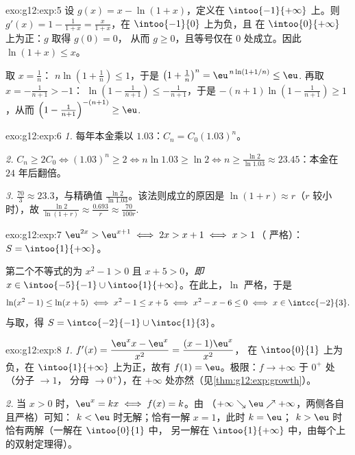 \begin{solution}{exo:g12:exp:5}
设 $g(x) = x - \ln(1+x)$，定义在 $\intoo{-1}{+\infty}$ 上。则
$g'(x) = 1 - \frac{1}{1+x} = \frac{x}{1+x}$，在 $\intoo{-1}{0}$ 上为负，且
在 $\intoo{0}{+\infty}$ 上为正：$g$ 取得 $g(0) = 0$，
从而 $g \geq 0$，且等号仅在 $0$ 处成立。因此 $\ln(1+x) \leq x$。

取 $x = \frac1n$：
$n\ln\left(1 + \frac1n\right) \leq 1$，于是
$\left(1+\frac1n\right)^n = \eu^{\,n\ln(1+1/n)} \leq \eu$.
再取 $x = -\frac{1}{n+1} > -1$：
$\ln\left(1 - \frac{1}{n+1}\right) \leq -\frac{1}{n+1}$，于是
$-(n+1)\ln\left(1 - \frac{1}{n+1}\right) \geq 1$，从而
$\left(1 - \frac{1}{n+1}\right)^{-(n+1)} \geq \eu$.
\end{solution}

\begin{solution}{exo:g12:exp:6}
\emph{1.} 每年本金乘以 $1.03$：$C_n = C_0 (1.03)^n$。

\emph{2.} $C_n \geq 2C_0 \iff (1.03)^n \geq 2 \iff n \ln 1.03 \geq \ln 2
\iff n \geq \frac{\ln 2}{\ln 1.03} \approx 23.45$：本金在
$24$ 年后翻倍。

\emph{3.} $\frac{70}{3} \approx 23.3$，与精确值
$\frac{\ln 2}{\ln 1.03}$。该法则成立的原因是
$\ln(1 + r) \approx r$（$r$ 较小时），故
$\frac{\ln 2}{\ln(1+r)} \approx \frac{0.693}{r} \approx \frac{70}{100r}$.
\end{solution}

\begin{solution}{exo:g12:exp:7}
$\eu^{2x} > \eu^{x+1} \iff 2x > x + 1 \iff x > 1$（
严格）：$S = \intoo{1}{+\infty}$。

第二个不等式的为 $x^2 - 1 > 0$ 且 $x + 5 > 0$，\emph{即}
$x \in \intoo{-5}{-1} \cup \intoo{1}{+\infty}$。在此上，$\ln$
严格，于是
\[
\ln(x^2-1) \leq \ln(x+5) \iff x^2 - 1 \leq x + 5 \iff x^2 - x - 6 \leq 0
\iff x \in \intcc{-2}{3}.
\]
与取，得 $S = \intco{-2}{-1} \cup \intoc{1}{3}$。
\end{solution}

\begin{solution}{exo:g12:exp:8}
\emph{1.} $f'(x) = \dfrac{\eu^x x - \eu^x}{x^2} = \dfrac{(x-1)\eu^x}{x^2}$，
在 $\intoo{0}{1}$ 上为负，在 $\intoo{1}{+\infty}$ 上为正，故有
$f(1) = \eu$。极限：$f \to +\infty$ 于 $0^+$ 处（分子 $\to 1$，
分母 $\to 0^+$），在 $+\infty$ 处亦然（见\cref{thm:g12:exp:growth}）。

\emph{2.} 当 $x > 0$ 时，$\eu^x = kx \iff f(x) = k$。由
（$+\infty \searrow \eu \nearrow +\infty$，两侧各自且严格）可知：
$k < \eu$ 时无解；恰有一解 $x = 1$，此时 $k = \eu$；
$k > \eu$ 时恰有两解（一解在 $\intoo{0}{1}$ 中，
另一解在 $\intoo{1}{+\infty}$ 中，由每个上的双射定理得）。
\end{solution}

